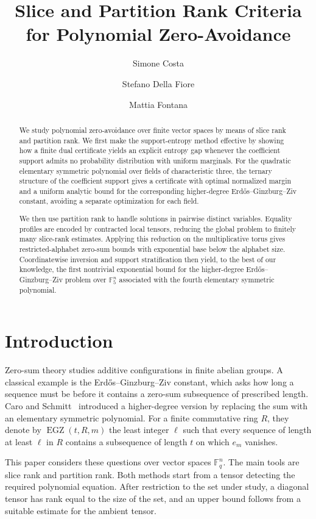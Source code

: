 \documentclass[10pt,a4paper]{amsart}
\title[Slice and partition rank criteria]
{Slice and Partition Rank Criteria for Polynomial Zero-Avoidance}
\author{Simone Costa}
\author{Stefano Della Fiore}
\author{Mattia Fontana}
\theoremstyle{definition}
\newcommand{\F}{\mathbb F}
\newcommand{\EGZ}{\operatorname{EGZ}}
\newcommand{\1}{\mathbf 1}
\begin{document}
\begin{abstract}
We study polynomial zero-avoidance over finite vector spaces by means of slice rank and partition rank.  We first make the support-entropy method effective by showing how a finite dual certificate yields an explicit entropy gap whenever the coefficient support admits no probability distribution with uniform marginals.  For the quadratic elementary symmetric polynomial over fields of characteristic three, the ternary structure of the coefficient support gives a certificate with optimal normalized margin and a uniform analytic bound for the corresponding higher-degree Erd\H{o}s--Ginzburg--Ziv constant, avoiding a separate optimization for each field.

We then use partition rank to handle solutions in pairwise distinct variables.  Equality profiles are encoded by contracted local tensors, reducing the global problem to finitely many slice-rank estimates.  Applying this reduction on the multiplicative torus gives restricted-alphabet zero-sum bounds with exponential base below the alphabet size.  Coordinatewise inversion and support stratification then yield, to the best of our knowledge, the first nontrivial exponential bound for the higher-degree Erd\H{o}s--Ginzburg--Ziv problem over $\F_5^n$ associated with the fourth elementary symmetric polynomial.
\end{abstract}

\maketitle

\section{Introduction}

Zero-sum theory studies additive configurations in finite abelian groups.  A classical example is the Erd\H{o}s--Ginzburg--Ziv constant, which asks how long a sequence must be before it contains a zero-sum subsequence of prescribed length.  Caro and Schmitt~\cite{CaroSchmitt} introduced a higher-degree version by replacing the sum with an elementary symmetric polynomial.  For a finite commutative ring $R$, they denote by $\EGZ(t,R,m)$ the least integer $\ell$ such that every sequence of length at least $\ell$ in $R$ contains a subsequence of length $t$ on which $e_m$ vanishes.

This paper considers these questions over vector spaces $\F_q^n$.  The main tools are slice rank and partition rank.  Both methods start from a tensor detecting the required polynomial equation.  After restriction to the set under study, a diagonal tensor has rank equal to the size of the set, and an upper bound follows from a suitable estimate for the ambient tensor.
\end{document}
